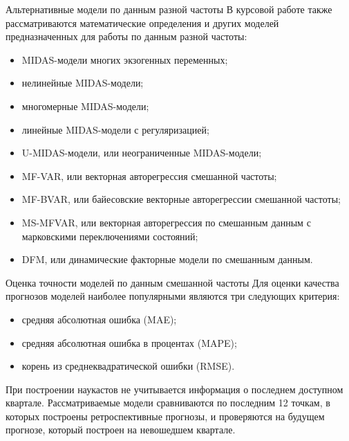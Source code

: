 \documentclass[notheorems, 10pt]{beamer}
\begin{document}

\begin{frame}
	{Альтернативные модели по данным разной частоты}
	В курсовой работе также рассматриваются математические определения и других моделей предназначенных для работы по данным разной частоты:
	\begin{itemize}
		\item MIDAS-модели многих экзогенных переменных;
		\item нелинейные MIDAS-модели;
		\item многомерные MIDAS-модели;
		\item линейные MIDAS-модели с регуляризацией;
		\item U-MIDAS-модели, или неограниченные MIDAS-модели;
		\item MF-VAR, или векторная авторегрессия смешанной частоты;
		\item MF-BVAR, или байесовские векторные авторегрессии смешанной частоты;
		\item MS-MFVAR, или векторная авторегрессия по смешанным данным с марковскими переключениями состояний;
		\item DFM, или динамические факторные модели по смешанным данным.
	\end{itemize}
\end{frame}


\begin{frame}
	{Оценка точности моделей по данным смешанной частоты}
	Для оценки качества прогнозов моделей наиболее популярными являются три следующих критерия: 
	\begin{itemize}
		\item средняя абсолютная ошибка (MAE);
		\item средняя абсолютная ошибка в процентах (MAPE);
		\item корень из среднеквадратической ошибки (RMSE).
	\end{itemize}
	При построении наукастов не учитывается информация о последнем доступном квартале. Рассматриваемые модели сравниваются по последним 12 точкам, в которых построены ретроспективные прогнозы, и проверяются на будущем прогнозе, который построен на невошедшем квартале.
\end{frame}

\end{document}
